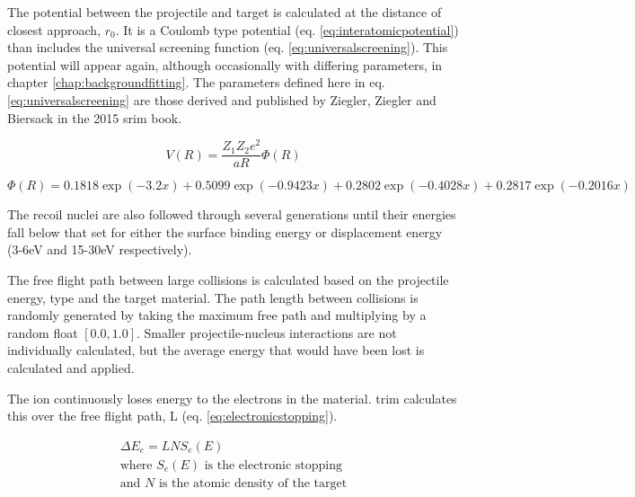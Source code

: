 The potential between the projectile and target is calculated at the distance of closest approach, $r_0$.  It is a Coulomb type potential (eq. \ref{eq:interatomicpotential}) than includes the universal screening function (eq. \ref{eq:universalscreening})\cite{srimbook}.  This potential will appear again, although occasionally with differing parameters, in chapter \ref{chap:backgroundfitting}.  The parameters defined here in eq. \ref{eq:universalscreening} are those derived and published by Ziegler, Ziegler and Biersack in the 2015 \acrshort{srim} book\cite{srimbook}.

\begin{equation}
V(R) = \frac{Z_1 Z_2 e^2}{a R} \Phi(R)
\label{eq:interatomicpotential}
\end{equation}

\begin{equation}
\Phi(R) = 0.1818 \exp(-3.2 x) + 0.5099 \exp(-0.9423 x) + 0.2802 \exp(-0.4028 x) + 0.2817 \exp(-0.2016 x)
\label{eq:universalscreening}
\end{equation}

The recoil nuclei are also followed through several generations until their energies fall below that set for either the surface binding energy or displacement energy (3-6eV and 15-30eV respectively)\cite{srimbook}.  

The free flight path between large collisions is calculated based on the projectile energy, type and the target material.  The path length between collisions is randomly generated by taking the maximum free path and multiplying by a random float $[0.0, 1.0]$.  Smaller projectile-nucleus interactions are not individually calculated, but the average energy that would have been lost is calculated and applied.

The ion continuously loses energy to the electrons in the material.  \acrshort{trim} calculates this over the free flight path, L (eq. \ref{eq:electronicstopping}).

\begin{equation}
\begin{split}
\Delta E_e = L N S_e (E) \\
\text{where } S_e (E) \text{ is the electronic stopping} \\
\text{and } N \text{ is the atomic density of the target} \\
\end{split}
\label{eq:electronicstopping}
\end{equation}

